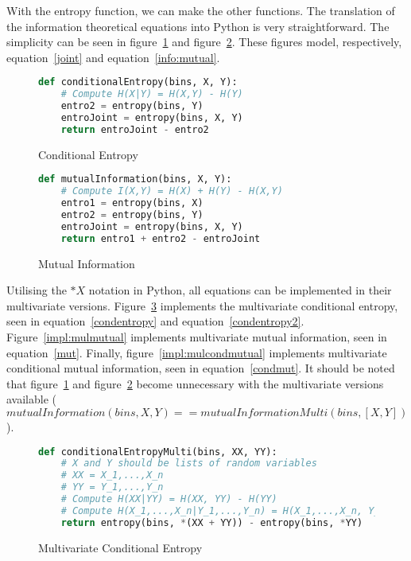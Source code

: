 With the entropy function, we can make the other functions. The translation of the information theoretical equations into Python is very straightforward. The simplicity can be seen in figure~\ref{impl:condetr} and figure~\ref{impl:mutual}. These figures model, respectively, equation~\ref{joint} and equation~\ref{info:mutual}.

\begin{figure}[H]
\caption{Conditional Entropy}
\label{impl:condetr}
\begin{lstlisting}[language=Python]
def conditionalEntropy(bins, X, Y):
    # Compute H(X|Y) = H(X,Y) - H(Y)
    entro2 = entropy(bins, Y)
    entroJoint = entropy(bins, X, Y)
    return entroJoint - entro2
\end{lstlisting}
\end{figure}

\begin{figure}[H]
\caption{Mutual Information}
\label{impl:mutual}
\begin{lstlisting}[language=Python]
def mutualInformation(bins, X, Y):
    # Compute I(X,Y) = H(X) + H(Y) - H(X,Y)
    entro1 = entropy(bins, X)
    entro2 = entropy(bins, Y)
    entroJoint = entropy(bins, X, Y)
    return entro1 + entro2 - entroJoint
\end{lstlisting}
\end{figure}

Utilising the $*X$ notation in Python, all equations can be implemented in their multivariate versions. Figure~\ref{impl:mulcondetr} implements the multivariate conditional entropy, seen in equation~\ref{condentropy} and equation~\ref{condentropy2}. Figure~\ref{impl:mulmutual} implements multivariate mutual information, seen in equation~\ref{mut}. Finally, figure~\ref{impl:mulcondmutual} implements multivariate conditional mutual information, seen in equation~\ref{condmut}. It should be noted that figure~\ref{impl:condetr} and figure~\ref{impl:mutual} become unnecessary with the multivariate versions available ($mutualInformation(bins, X, Y) == mutualInformationMulti(bins, [X, Y])$).

\begin{figure}[H]
\caption{Multivariate Conditional Entropy}
\label{impl:mulcondetr}
\begin{lstlisting}[language=Python]
def conditionalEntropyMulti(bins, XX, YY):
    # X and Y should be lists of random variables
    # XX = X_1,...,X_n
    # YY = Y_1,...,Y_n
    # Compute H(XX|YY) = H(XX, YY) - H(YY)
    # Compute H(X_1,...,X_n|Y_1,...,Y_n) = H(X_1,...,X_n, Y_1,...,Y_n) - H(Y_1,...,Y_n)
    return entropy(bins, *(XX + YY)) - entropy(bins, *YY)
\end{lstlisting}
\end{figure}

